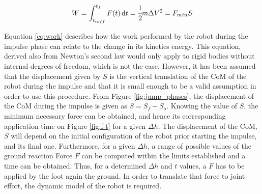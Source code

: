\begin{equation}
\label{eq:work}
	W = \int_{t_{toff}}^{t_{f}} F(t)\,\mathrm{d}t = \cfrac{1}{2} m \Delta V^2 = F_{min} S
\end{equation}

Equation \ref{eq:work} describes how the work performed by the robot during the impulse phase can relate to the change in its kinetics energy. 
This equation, derived also from Newton's second law would only apply to rigid bodies without internal degrees of freedom, which is not the case.
However, it has been assumed that the displacement given by $S$ is the vertical translation of the CoM of the robot during the impulse and that it is small enough to be a valid assumption in order to use this procedure.
From Figure \ref{fig:jump_phases}, the displacement of the CoM during the impulse is given as $S=S_{f}-S_{o}$.
Knowing the value of $S$, the minimum necessary force can be obtained, and hence its corresponding application time on Figure \ref{fig:f-t} for a given $\Delta h$.
The displacement of the CoM, $S$ will depend on the initial configuration of the robot prior starting the impulse, and its final one.
Furthermore, for a given $\Delta h$, a range of possible values of the ground reaction Force $F$ can be computed within the limits established and a time can be obtained.
Thus, for a determined $\Delta h$ and $t$ values, a $F$ has to be applied by the foot again the ground.
In order to translate that force to joint effort, the dynamic model of the robot is required.


